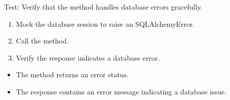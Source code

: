 \documentclass[letterpaper,10pt,english]{sphinxmanual}
\begin{document}
\begin{fulllineitems}
\label{\detokenize{test:test.test_residetnt.test_update_resident_room_database_error}}
\pysigstartsignatures
\pysiglinewithargsret
{}
{\sphinxparamcomma {}}
{}
\pysigstopsignatures
\sphinxAtStartPar
Test: Verify that the method handles database errors gracefully.
\begin{description}
\begin{enumerate}
%
\item {} 
\sphinxAtStartPar
Mock the database session to raise an SQLAlchemyError.

\item {} 
\sphinxAtStartPar
Call the  method.

\item {} 
\sphinxAtStartPar
Verify the response indicates a database error.

\end{enumerate}

\begin{itemize}
\item {} 
\sphinxAtStartPar
The method returns an error status.

\item {} 
\sphinxAtStartPar
The response contains an error message indicating a database issue.

\end{itemize}

\end{description}

\end{fulllineitems}

\end{document}
